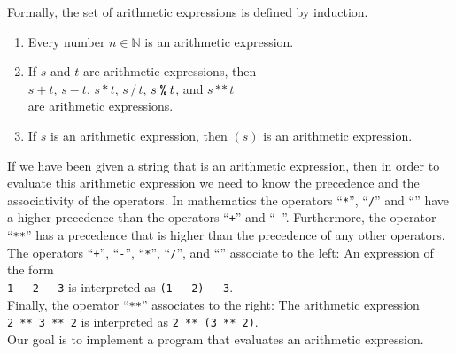 Formally, the set of arithmetic expressions is defined by induction.
\begin{enumerate}
\item Every number $n \in \mathbb{N}$ is an arithmetic expression.
\item If $s$ and $t$ are arithmetic expressions, then
      \\[0.2cm]
      \hspace*{1.3cm}
      $s + t$, \quad $s - t$, \quad $s * t$, \quad
      $s \,/\, t$, \quad $s \;\texttt{\symbol{37}}\; t$, \quad and \quad $s \,\texttt{**}\, t$
      \\[0.2cm]
      are arithmetic expressions.
\item If $s$ is an arithmetic expression, then $(s)$ is an arithmetic expression.
\end{enumerate}
If we have been given a string that is an arithmetic expression, then in order to evaluate this
arithmetic expression we need to know the precedence and the associativity of the operators.
In mathematics the operators ``\texttt{*}'', ``\texttt{/}'' and ``\texttt{}'' have a
higher precedence than the operators ``\texttt{+}'' and ``\texttt{-}''.  Furthermore, the operator
  ``\texttt{**}'' has a precedence that is higher than the precedence
 of any other operators.  The operators
``\texttt{+}'', ``\texttt{-}'', ``\texttt{*}'', ``\texttt{/}'', and ``\texttt{}''
associate to the left:  An expression of the form 
\\[0.2cm]
\hspace*{1.3cm} 
\texttt{1 - 2 - 3} \quad is interpreted as \quad \texttt{(1 - 2) - 3}.
 \\[0.2cm]
Finally, the operator ``\texttt{**}'' associates to the right:
The arithmetic expression \\[0.2cm]
\hspace*{1.3cm} 
\texttt{2 \texttt{**} 3 \texttt{**}  2} \quad is interpreted as \quad 
\texttt{2 \texttt{**} (3 \texttt{**} 2)}. 
\\[0.2cm]
Our goal is to implement a program that evaluates an arithmetic expression.


